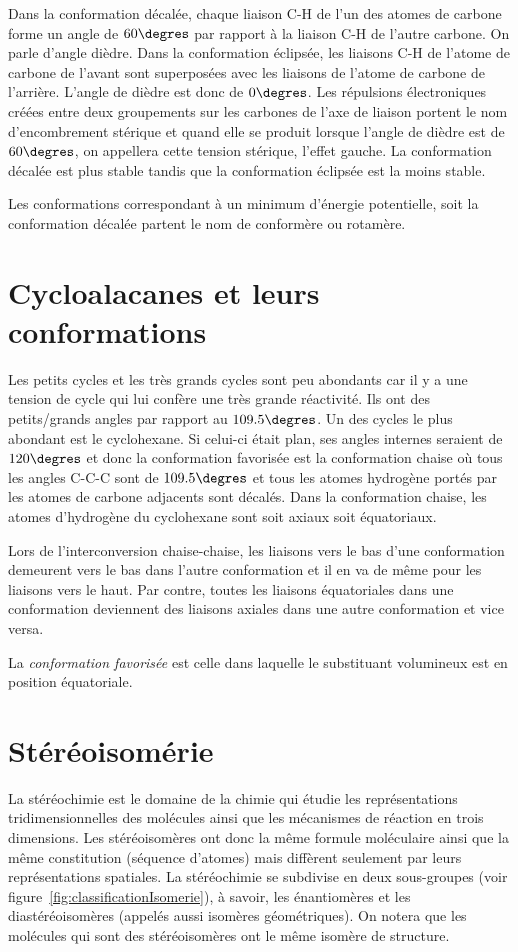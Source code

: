 Dans la conformation décalée, chaque liaison C-H de l'un des atomes de carbone forme un angle de $60\degres$ par rapport à la liaison C-H de l'autre carbone.
On parle d'angle dièdre.
Dans la conformation éclipsée, les liaisons C-H de l'atome de carbone de l'avant sont superposées avec les liaisons de l'atome de carbone de l'arrière.
L'angle de dièdre est donc de $0\degres$.
Les répulsions électroniques créées entre deux groupements sur les carbones de l'axe de liaison portent le nom d'encombrement stérique et quand elle se produit lorsque l'angle de dièdre est de $60\degres$, on appellera cette tension stérique, l'effet gauche.
La conformation décalée est plus stable tandis que la conformation éclipsée est la moins stable.

Les conformations correspondant à un minimum d'énergie potentielle, soit la conformation décalée partent le nom de conformère ou rotamère.

\section{Cycloalacanes et leurs conformations}
Les petits cycles et les très grands cycles sont peu abondants car il y a une tension de cycle qui lui confère une très grande réactivité.
Ils ont des petits/grands angles par rapport au $109.5\degres$.
Un des cycles le plus abondant est le cyclohexane.
Si celui-ci était plan, ses angles internes seraient de $120\degres$ et donc la conformation favorisée est la conformation chaise où tous les angles C-C-C sont de $109.5\degres$ et tous les atomes hydrogène portés par les atomes de carbone adjacents sont décalés.
Dans la conformation chaise, les atomes d'hydrogène du cyclohexane sont soit axiaux soit équatoriaux.

Lors de l'interconversion chaise-chaise, les liaisons vers le bas d'une conformation demeurent vers le bas dans l'autre conformation et il en va de même pour les liaisons vers le haut.
Par contre, toutes les liaisons équatoriales dans une conformation deviennent des liaisons axiales dans une autre conformation et vice versa.

La \emph{conformation favorisée} est celle dans laquelle le substituant volumineux est en position équatoriale.

\section{Stéréoisomérie}
La stéréochimie est le domaine de la chimie qui étudie les représentations tridimensionnelles des  molécules ainsi que les mécanismes de réaction en trois dimensions.
Les stéréoisomères ont donc la même formule moléculaire
ainsi que la même constitution (séquence d'atomes) mais 
diffèrent seulement par leurs représentations spatiales.
La stéréochimie se subdivise en deux sous-groupes (voir figure~\ref{fig:classificationIsomerie}), 
à savoir, les énantiomères et les diastéréoisomères (appelés aussi isomères géométriques).
On notera que les molécules qui sont des stéréoisomères 
ont le même isomère de structure.

